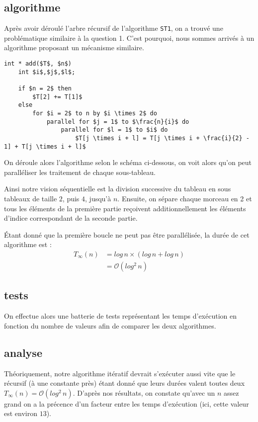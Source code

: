 \subsection*{algorithme}
Après avoir déroulé l'arbre récursif de l'algorithme \verb+ST1+, on a trouvé une problématique similaire à la question 1. C'est pourquoi, nous sommes arrivés à un algorithme proposant un mécanisme similaire.

\begin{lstlisting}[mathescape, style=cilk, title=Algorithme ittératif]
int * add($T$, $n$)
    int $i$,$j$,$l$;

    if $n = 2$ then
        $T[2] += T[1]$
    else
        for $i = 2$ to n by $i \times 2$ do
            parallel for $j = 1$ to $\frac{n}{i}$ do
                parallel for $l = 1$ to $i$ do
                    $T[j \times i + l] = T[j \times i + \frac{i}{2} - 1] + T[j \times i + l]$
\end{lstlisting}

On déroule alors l'algorithme selon le schéma ci-dessous, on voit alors qu'on peut paralléliser les traitement de chaque sous-tableau.



Ainsi notre vision séquentielle est la division successive du tableau en sous tableaux de taille $2$, puis $4$, jusqu'à $n$. Ensuite, on sépare chaque morceau en 2 et tous les éléments de la première partie reçoivent additionnellement les éléments d'indice correspondant de la seconde partie.

Étant donné que la première boucle ne peut pas être parallélisée, la durée de cet algorithme est :
\begin{equation} \label{eq3}
\begin{split}
T_\infty(n) & = log \, n \times (log \, n + log \, n)\\ 
 & = \mathcal{O} (log^2 \, n)
\end{split}
\end{equation}

\subsection*{tests}

On effectue alors une batterie de tests représentant les temps d'exécution en fonction du nombre de valeurs afin de comparer les deux algorithmes.



\subsection*{analyse}
Théoriquement, notre algorithme itératif devrait s'exécuter aussi vite que le récursif (à une constante près) étant donné que leurs durées valent toutes deux $T_\infty(n) = \mathcal{O} (log^2 \, n)$. D'après nos résultats, on constate qu'avec un $n$ assez grand on a la précence d'un facteur entre les temps d'exécution (ici, cette valeur est environ $13$). 

